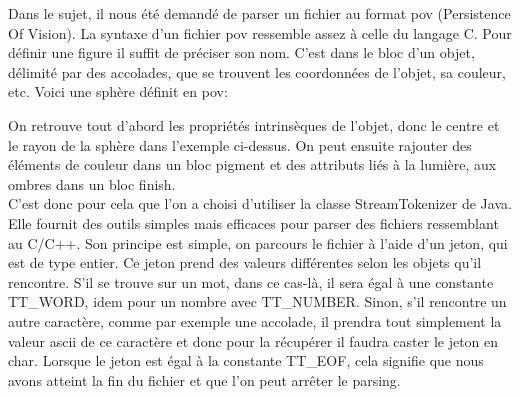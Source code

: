 \documentclass[../../Rapport RayTracer]{subfiles}
\begin{document}
Dans le sujet, il nous été demandé de parser un fichier au format pov (Persistence Of Vision). La syntaxe d'un fichier pov ressemble assez à celle du langage C. Pour définir une figure il suffit de préciser son nom. C'est dans le bloc d'un objet, délimité par des accolades, que se trouvent les coordonnées de l'objet, sa couleur, etc. Voici une sphère définit en pov:

 

On retrouve tout d'abord les propriétés intrinsèques de l'objet, donc le centre et le rayon de la sphère dans l'exemple ci-dessus. On peut ensuite rajouter des éléments de couleur dans un bloc pigment et des attributs liés à la lumière, aux ombres dans un bloc finish.
\\
C'est donc pour cela que l'on a choisi d'utiliser la classe StreamTokenizer de Java. Elle fournit des outils simples mais efficaces pour parser des fichiers ressemblant au C/C++. Son principe est simple, on parcours le fichier à l'aide d'un jeton, qui est de type entier. Ce jeton prend des valeurs différentes selon les objets qu'il rencontre. S'il se trouve sur un mot, dans ce cas-là, il sera égal à une constante TT\_WORD, idem pour un nombre avec TT\_NUMBER. Sinon, s'il rencontre un autre caractère, comme par exemple une accolade, il prendra tout simplement la valeur ascii de ce caractère et donc pour la récupérer il faudra caster le jeton en char. Lorsque le jeton est égal à la constante TT\_EOF, cela signifie que nous avons atteint la fin du fichier et que l'on peut arrêter le parsing.
\end{document}

